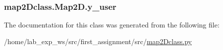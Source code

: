 \subsubsection[{\texorpdfstring{y\+\_\+user}{y_user}}]{\setlength{\rightskip}{0pt plus 5cm}map2\+Dclass.\+Map2\+D.\+y\+\_\+user}\hypertarget{classmap2Dclass_1_1Map2D_ab7979918e584a7d6ef5f45bbaf5a22af}{}\label{classmap2Dclass_1_1Map2D_ab7979918e584a7d6ef5f45bbaf5a22af}


The documentation for this class was generated from the following file\+:\begin{DoxyCompactItemize}
\item 
/home/lab\+\_\+exp\+\_\+ws/src/first\+\_\+assignment/src/\hyperlink{map2Dclass_8py}{map2\+Dclass.\+py}\end{DoxyCompactItemize}
